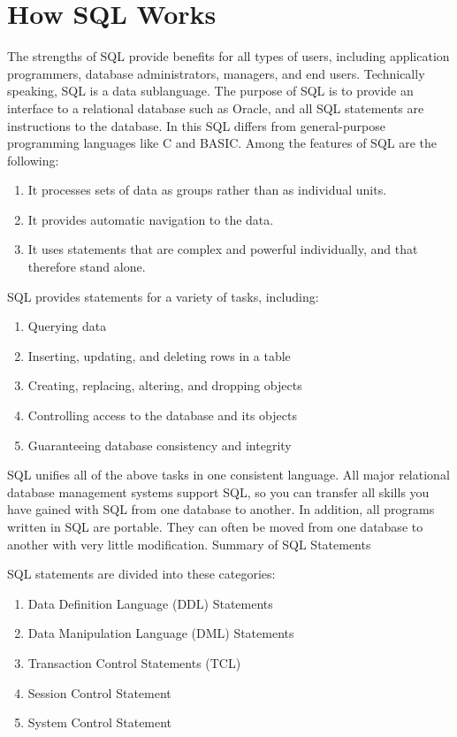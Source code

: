 \documentclass[10pt,a4paper,titlepage]{report}
\begin{document}
{\chapter{How SQL Works}

The strengths of SQL provide benefits for all types of users, including application programmers, database administrators, managers, and end users. Technically speaking, SQL is a data sublanguage. The purpose of SQL is to provide an interface to a relational database such as Oracle, and all SQL statements are instructions to the database. In this SQL differs from general-purpose programming languages like C and BASIC. Among the features of SQL are the following:
\begin{enumerate}
	\item It processes sets of data as groups rather than as individual units.
	\item It provides automatic navigation to the data.
	\item It uses statements that are complex and powerful individually, and that therefore stand alone.
\end{enumerate}

SQL provides statements for a variety of tasks, including:
\begin{enumerate}
	\item Querying data
	\item Inserting, updating, and deleting rows in a table
	\item Creating, replacing, altering, and dropping objects
	\item Controlling access to the database and its objects
	\item Guaranteeing database consistency and integrity
\end{enumerate}

SQL unifies all of the above tasks in one consistent language. All major relational database management systems support SQL, so you can transfer all skills you have gained with SQL from one database to another. In addition, all programs written in SQL are portable. They can often be moved from one database to another with very little modification. Summary of SQL Statements

SQL statements are divided into these categories:
\begin{enumerate}
	\item Data Definition Language (DDL) Statements
	\item Data Manipulation Language (DML) Statements
	\item Transaction Control Statements (TCL)
	\item Session Control Statement
	\item System Control Statement
\end{enumerate}

}
\end{document}
